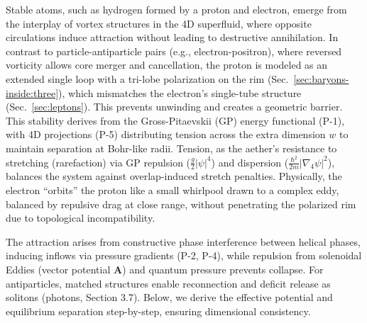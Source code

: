 Stable atoms, such as hydrogen formed by a proton and electron, emerge from the interplay of vortex structures in the 4D superfluid, where opposite circulations induce attraction without leading to destructive annihilation. In contrast to particle-antiparticle pairs (e.g., electron-positron), where reversed vorticity allows core merger and cancellation, the proton is modeled as an extended single loop with a tri-lobe polarization on the rim (Sec.~\ref{sec:baryons-inside:three}), which mismatches the electron's single-tube structure (Sec.~\ref{sec:leptons}). This prevents unwinding and creates a geometric barrier. This stability derives from the Gross-Pitaevskii (GP) energy functional (P-1), with 4D projections (P-5) distributing tension across the extra dimension $w$ to maintain separation at Bohr-like radii. Tension, as the aether's resistance to stretching (rarefaction) via GP repulsion ($\frac{g}{2} |\psi|^4$) and dispersion ($\frac{\hbar^2}{2m} |\nabla_4 \psi|^2$), balances the system against overlap-induced stretch penalties. Physically, the electron “orbits” the proton like a small whirlpool drawn to a complex eddy, balanced by repulsive drag at close range, without penetrating the polarized rim due to topological incompatibility.

The attraction arises from constructive phase interference between helical phases, inducing inflows via pressure gradients (P-2, P-4), while repulsion from solenoidal Eddies (vector potential $\mathbf{A}$) and quantum pressure prevents collapse. For antiparticles, matched structures enable reconnection and deficit release as solitons (photons, Section 3.7). Below, we derive the effective potential and equilibrium separation step-by-step, ensuring dimensional consistency.

